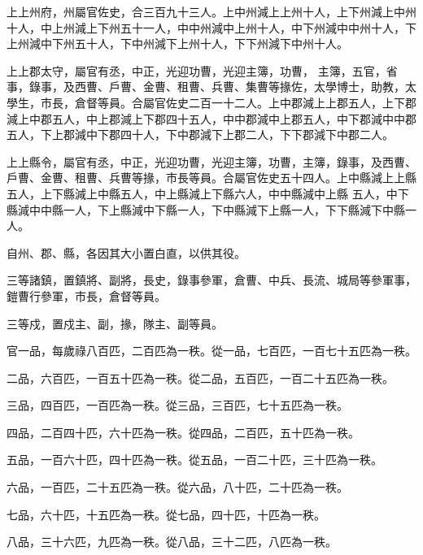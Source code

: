 \begin{pinyinscope}
 上上州府，州屬官佐史，合三百九十三人。上中州減上上州十人，上下州減上中州十人，中上州減上下州五十一人，中中州減中上州十人，中下州減中中州十人，下上州減中下州五十人，下中州減下上州十人，下下州減下中州十人。



 上上郡太守，屬官有丞，中正，光迎功曹，光迎主簿，功曹，
 主簿，五官，省事，錄事，及西曹、戶曹、金曹、租曹、兵曹、集曹等掾佐，太學博士，助教，太學生，市長，倉督等員。合屬官佐史二百一十二人。上中郡減上上郡五人，上下郡減上中郡五人，中上郡減上下郡四十五人，中中郡減中上郡五人，中下郡減中中郡五人，下上郡減中下郡四十人，下中郡減下上郡二人，下下郡減下中郡二人。



 上上縣令，屬官有丞，中正，光迎功曹，光迎主簿，功曹，主簿，錄事，及西曹、戶曹、金曹、租曹、兵曹等掾，市長等員。合屬官佐史五十四人。上中縣減上上縣五人，上下縣減上中縣五人，中上縣減上下縣六人，中中縣減中上縣
 五人，中下縣減中中縣一人，下上縣減中下縣一人，下中縣減下上縣一人，下下縣減下中縣一人。



 自州、郡、縣，各因其大小置白直，以供其役。



 三等諸鎮，置鎮將、副將，長史，錄事參軍，倉曹、中兵、長流、城局等參軍事，鎧曹行參軍，市長，倉督等員。



 三等戍，置戍主、副，掾，隊主、副等員。



 官一品，每歲祿八百匹，二百匹為一秩。從一品，七百匹，一百七十五匹為一秩。



 二品，六百匹，一百五十匹為一秩。從二品，五百匹，一百二十五匹為一秩。



 三品，四百匹，一百匹為一秩。從三品，三百匹，七十五匹為一秩。



 四品，二百四十匹，六十匹為一秩。從四品，二百匹，五十匹為一秩。



 五品，一百六十匹，四十匹為一秩。從五品，一百二十匹，三十匹為一秩。



 六品，一百匹，二十五匹為一秩。從六品，八十匹，二十匹為一秩。



 七品，六十匹，十五匹為一秩。從七品，四十匹，十匹為一秩。



 八品，三十六匹，九匹為一秩。從八品，三十二匹，八匹為一秩。




\end{pinyinscope}
